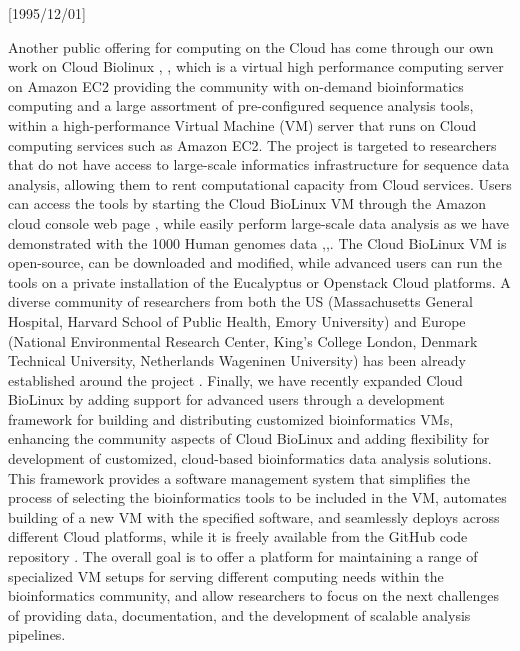 \NeedsTeXFormat{LaTeX2e}[1995/12/01] \documentclass[10pt]{bmc_article}
\newenvironment{bmcformat}{\begin{raggedright}\baselineskip20pt\sloppy\setboolean{publ}{false}}{\end{raggedright}\baselineskip20pt\sloppy}
\begin{document}
\begin{bmcformat}
Another public offering for computing on the Cloud has come through our own work on Cloud Biolinux \cite{Krampis2012},
\cite{cloudbio}, which is a virtual high performance computing server on Amazon EC2 providing the community with 
on-demand bioinformatics computing and a large assortment of pre-configured sequence analysis tools, within 
a high-performance Virtual Machine (VM) server that runs on Cloud computing services such as Amazon EC2. The project is targeted 
to researchers that do not have access to large-scale informatics infrastructure for sequence data analysis, 
allowing them to rent computational capacity from Cloud services. Users can access the tools by starting the 
Cloud BioLinux VM through the Amazon cloud console web page \cite{}, while easily perform large-scale data analysis
as we have demonstrated with the 1000 Human genomes data \cite{},\cite{},\cite{}. The Cloud BioLinux VM is 
open-source, can be downloaded and modified, while advanced users can run the tools on a private installation of 
the Eucalyptus \cite{} or Openstack \cite{} Cloud platforms. A diverse community of researchers from both the US
(Massachusetts General Hospital, Harvard School of Public Health, Emory University) and Europe (National
Environmental Research Center, King's College London, Denmark Technical University, Netherlands Wageninen
University) has been already established around the project \cite{}. Finally, we have recently expanded Cloud
BioLinux by adding support for advanced users through a development framework for building and distributing
customized bioinformatics VMs, enhancing the community aspects of Cloud BioLinux and adding flexibility for 
development of customized, cloud-based bioinformatics data analysis solutions. This framework provides a
software management system that simplifies the process of selecting the bioinformatics tools to be included in
the VM, automates building of a new VM with the specified software, and seamlessly deploys across different
Cloud platforms, while it is freely available from the GitHub code repository \cite{}.  The overall goal is
to offer a platform for maintaining a range of specialized VM setups for serving different computing needs
within the bioinformatics community, and allow researchers to focus on the next challenges of providing data,
documentation, and the development of scalable analysis pipelines. 



\end{bmcformat}
\end{document}

